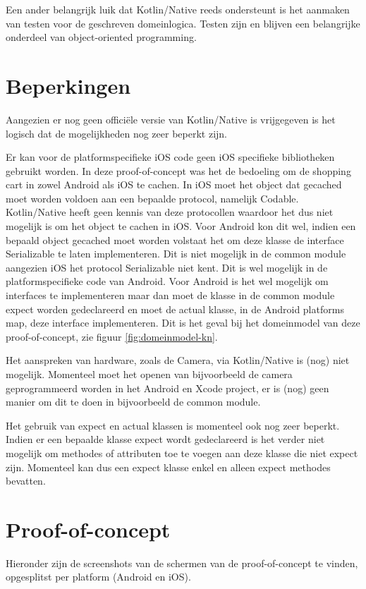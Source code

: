 Een ander belangrijk luik dat Kotlin/Native reeds ondersteunt is het aanmaken van testen voor de geschreven domeinlogica. Testen zijn en blijven een belangrijke onderdeel van object-oriented programming.

\section{Beperkingen}
Aangezien er nog geen officiële versie van Kotlin/Native is vrijgegeven is het logisch dat de mogelijkheden nog zeer beperkt zijn. 

Er kan voor de platformspecifieke iOS code geen iOS specifieke bibliotheken gebruikt worden. In deze proof-of-concept was het de bedoeling om de shopping cart in zowel Android als iOS te cachen. In iOS moet het object dat gecached moet worden voldoen aan een bepaalde protocol, namelijk Codable. Kotlin/Native heeft geen kennis van deze protocollen waardoor het dus niet mogelijk is om het object te cachen in iOS. Voor Android kon dit wel, indien een bepaald object gecached moet worden volstaat het om deze klasse de interface Serializable te laten implementeren. Dit is niet mogelijk in de common module aangezien iOS het protocol Serializable niet kent. Dit is wel mogelijk in de platformspecifieke code van Android. Voor Android is het wel mogelijk om interfaces te implementeren maar dan moet de klasse in de common module expect worden gedeclareerd en moet de actual klasse, in de Android platforms map, deze interface implementeren. Dit is het geval bij het domeinmodel van deze proof-of-concept, zie figuur \ref{fig:domeinmodel-kn}.

Het aanspreken van hardware, zoals de Camera, via Kotlin/Native is (nog) niet mogelijk. Momenteel moet het openen van bijvoorbeeld de camera geprogrammeerd worden in het Android en Xcode project, er is (nog) geen manier om dit te doen in bijvoorbeeld de common module.

Het gebruik van expect en actual klassen is momenteel ook nog zeer beperkt. Indien er een bepaalde klasse expect wordt gedeclareerd is het verder niet mogelijk om methodes of attributen toe te voegen aan deze klasse die niet expect zijn. Momenteel kan dus een expect klasse enkel en alleen expect methodes bevatten.

\section{Proof-of-concept}
\label{sec:poc}
Hieronder zijn de screenshots van de schermen van de proof-of-concept te vinden, opgesplitst per platform (Android en iOS).
\newpage
